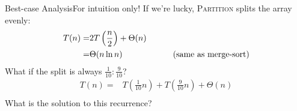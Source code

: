 \documentclass{beamer}
\begin{document}
\begin{frame}{Best-case Analysis}{For intuition only!}
    If we're lucky, \textsc{Partition} splits the array evenly:
    \begin{equation*}
        \begin{split}
            T(n) =& 2T\left(\frac{n}{2}\right) + \Theta(n) \\
                 =& \Theta(n \ln n) \text{\hspace{20mm} (same as merge-sort)} \\
        \end{split}
    \end{equation*}
    What if the split is always $\frac{1}{10}:\frac{9}{10}$?
    \begin{equation*}
        \begin{split}
            T(n) =& T\left(\frac{1}{10} n \right) + T\left(\frac{9}{10} n \right) + \Theta(n) \\
        \end{split}
    \end{equation*}
    What is the solution to this recurrence?
\end{frame}
\end{document}
